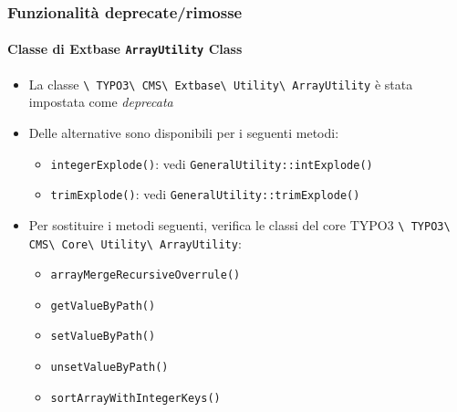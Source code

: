 \begin{frame}[fragile]
	\frametitle{Funzionalità deprecate/rimosse}
	\framesubtitle{Classe di Extbase \texttt{ArrayUtility} Class}

	\begin{itemize}
		\item La classe
			\texttt{\textbackslash
				TYPO3\textbackslash
				CMS\textbackslash
				Extbase\textbackslash
				Utility\textbackslash
				ArrayUtility} è stata impostata come \textit{deprecata}

		\item Delle alternative sono disponibili per i seguenti metodi:

			\begin{itemize}
				\item \texttt{integerExplode()}: vedi \texttt{GeneralUtility::intExplode()}
				\item \texttt{trimExplode()}: vedi \texttt{GeneralUtility::trimExplode()}
			\end{itemize}

		\item Per sostituire i metodi seguenti, verifica le classi del core TYPO3
			\texttt{\textbackslash
				TYPO3\textbackslash
				CMS\textbackslash
				Core\textbackslash
				Utility\textbackslash
				ArrayUtility}:

			\begin{itemize}
				\item \texttt{arrayMergeRecursiveOverrule()}
				\item \texttt{getValueByPath()}
				\item \texttt{setValueByPath()}
				\item \texttt{unsetValueByPath()}
				\item \texttt{sortArrayWithIntegerKeys()}
			\end{itemize}

	\end{itemize}

\end{frame}




